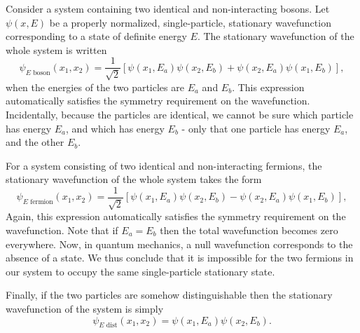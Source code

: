 Consider a system containing two identical and non-interacting bosons. Let $\psi(x, E)$ be a properly normalized, single-particle, stationary wavefunction corresponding to a state of definite energy $E$. The stationary wavefunction of the whole system is written
\begin{equation}
	\psi_{E \text{ boson}}(x_{1}, x_{2}) = \frac{1}{\sqrt{2}}[\psi(x_{1}, E_{a})\psi(x_{2}, E_{b}) + \psi(x_{2}, E_{a})\psi(x_{1}, E_{b})],
	\label{eq:5.4.7}
\end{equation}
when the energies of the two particles are $E_{a}$ and $E_{b}$. This expression automatically satisfies the symmetry requirement on the wavefunction. Incidentally, because the particles are identical, we cannot be sure which particle has energy $E_{a}$, and which has energy $E_{b}$ - only that one particle has energy $E_{a}$, and the other $E_{b}$.

For a system consisting of two identical and non-interacting fermions, the stationary wavefunction of the whole system takes the form
\begin{equation}
	\psi_{E \text{ fermion}}(x_{1}, x_{2}) = \frac{1}{\sqrt{2}}[\psi(x_{1}, E_{a})\psi(x_{2}, E_{b}) - \psi(x_{2}, E_{a})\psi(x_{1}, E_{b})],
	\label{eq:5.4.8}
\end{equation}
Again, this expression automatically satisfies the symmetry requirement on the wavefunction. Note that if $E_{a} = E_{b}$ then the total wavefunction becomes zero everywhere. Now, in quantum mechanics, a null wavefunction corresponds to the absence of a state. We thus conclude that it is impossible for the two fermions in our system to occupy the same single-particle stationary state.

Finally, if the two particles are somehow distinguishable then the stationary wavefunction of the system is simply
\begin{equation}
	\psi_{E \text{ dist}}(x_{1}, x_{2}) = \psi(x_{1}, E_{a})\psi(x_{2}, E_{b}).
	\label{eq:5.4.9}
\end{equation}

